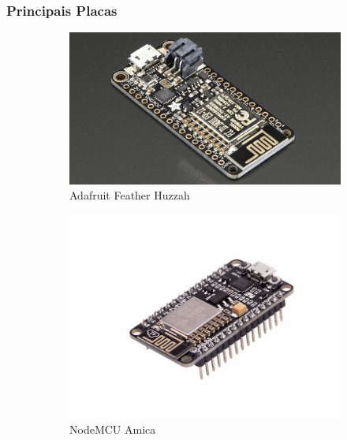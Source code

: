 \documentclass{beamer}
\begin{document}
\begin{frame}
	\frametitle{Principais Placas}
	\begin{minipage}{\textwidth}
		
		\begin{figure}
			\centering
			\begin{subfigure}[b]{0.25\textwidth}
				\includegraphics[width=\textwidth]{Feather_HUZZAH.jpg}
				\caption{Adafruit Feather Huzzah}
				\label{fig:arudifdnddfo_uno}
			\end{subfigure}
			\begin{subfigure}[b]{0.25\textwidth}
				\includegraphics[width=\textwidth]{NodeMCUAmica.jpg}
				\caption{NodeMCU Amica}
				\label{fig:node_mdscudfd}
			\end{subfigure}
			\begin{subfigure}[b]{0.25\textwidth}

\end{subfigure}
\end{figure}
\end{minipage}
\end{frame}
\end{document}
